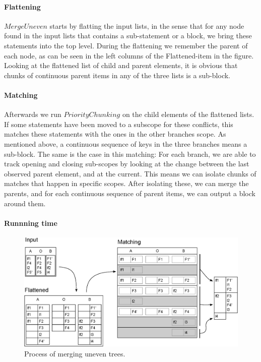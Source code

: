 \documentclass[11pt]{article}
\begin{document}
\paragraph{Flattening} $MergeUneven$ starts by flatting the input lists, in the sense that for any node found in the input lists that contains a sub-statement or a block, we bring these statements into the top level. During the flattening we remember the parent of each node, as can be seen in the left columns of the Flattened-item in the figure. Looking at the flattened list of child and parent elements,  it is obvious that chunks of continuous parent items in any of the three lists is a sub-block.

\paragraph{Matching} Afterwards we run $PriorityChunking$ on the child elements of the flattened lists. If some statements have been moved to a subscope for these conflicts, this matches these statements with the ones in the other branches scope. As mentioned above, a continuous sequence of keys in the three branches means a sub-block. The same is the case in this matching: For each branch, we are able to track opening and closing sub-scopes by looking at the change between the last observed parent element, and at the current. This means we can isolate chunks of matches that happen in specific scopes. After isolating these, we can merge the parents, and for each continuous sequence of parent items, we can output a block around them.

\paragraph{Runnning time} 

\begin{figure}
   \centerline{\includegraphics[scale=0.55]{drawings/html/EditedFlattenedMerge.eps}}
   \caption{Process of merging uneven trees.}
   \label{UeventreeProcess}
\end{figure}
\end{document}
